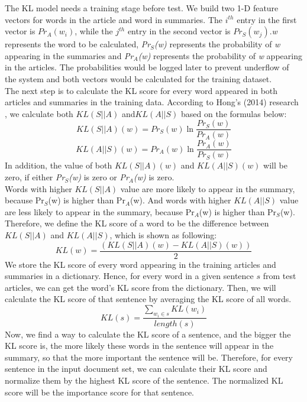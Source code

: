 \documentclass[11pt]{article}
\begin{document}
\indent
The KL model needs a training stage before test. We build two 1-D feature vectors for words in the article and word in summaries. The $i^{th}$ entry in the first vector is $Pr_A(w_i)$, while the $j^{th}$ entry in the second vector is $Pr_S(w_j)$.\emph{w} represents the word to be calculated, \emph{Pr$_S$(w)} represents the probability of \emph{w} appearing in the summaries and \emph{Pr$_A$(w)} represents the probability of \emph{w} appearing in the articles. The probabilities would be logged later to prevent underflow of the system and both vectors would be calculated for the training dataset. \\
\indent
The next step is to calculate the KL score for every word appeared in both articles and summaries in the training data. According to Hong's (2014) research , we calculate both $KL(S||A)$ and$KL(A||S)$ based on the formulas below: 
\begin{equation}
KL(S||A)(w) = Pr_S(w)\ln\frac{Pr_S(w)}{Pr_A(w)}
\end{equation}
\begin{equation}
KL(A||S)(w) = Pr_A(w)\ln\frac{Pr_A(w)}{Pr_S(w)}
\end{equation}
In addition, the value of both $KL(S||A)(w)$ and $KL(A||S)(w)$ will be zero, if either \emph{Pr$_S$(w)} is zero or \emph{Pr$_A$(w)} is zero. \\
\indent
Words with higher $KL(S||A)$ value are more likely to appear in the summary, because Pr$_S$(w) is higher than Pr$_A$(w). And words with higher $KL(A||S)$ value are less likely to appear in the summary, because Pr$_A$(w) is higher than Pr$_S$(w). Therefore, we define the KL score of a word to be the difference between $KL(S||A)$ and $KL(A||S)$, which is shown as following:
\begin{equation}
KL(w) = \frac{(KL(S||A)(w) - KL(A||S)(w))}{2}
\end{equation}
\indent
We store the KL score of every word appearing in the training articles and summaries in a dictionary. Hence, for every word in a given sentence $s$ from test articles, we can get the word's KL score from the dictionary. Then, we will calculate the KL score of that sentence by averaging the KL score of all words. 
\begin{equation}
KL(s) = \frac{\displaystyle\sum_{w_i \in s} KL(w_i)}{length(s)}
\end{equation}
\indent
Now, we find a way to calculate the KL score of a sentence, and the bigger the KL score is, the more likely these words in the sentence will appear in the summary, so that the more important the sentence will be. Therefore, for every sentence in the input document set, we can calculate their KL score and normalize them by the highest KL score of the sentence. The normalized KL score will be the importance score for that sentence.\\ 
\end{document}
